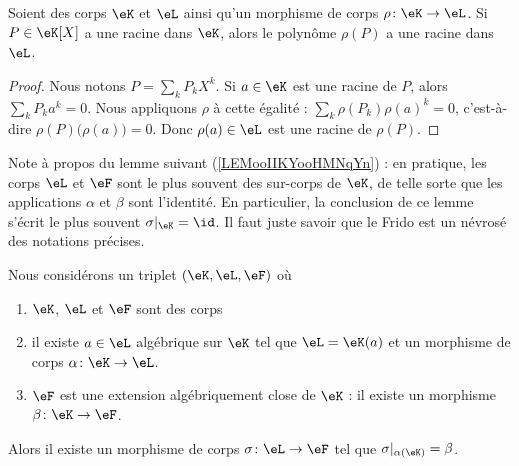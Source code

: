 \begin{lemma}
	Soient des corps \( \eK\) et \( \eL\) ainsi qu'un morphisme de corps \( \rho \colon \eK\to \eL\). Si \( P\in \eK[X]\) a une racine dans \( \eK\), alors le polynôme \( \rho(P)\) a une racine dans \( \eL\).
\end{lemma}

\begin{proof}
	Nous notons \( P=\sum_kP_kX^k\). Si \( a\in \eK\) est une racine de \( P\), alors \( \sum_kP_ka^k=0\). Nous appliquons \( \rho\) à cette égalité : \( \sum_k\rho(P_k)\rho(a)^k=0\), c'est-à-dire \( \rho(P)\big( \rho(a) \big)=0\). Donc \( \rho(a)\in \eL\) est une racine de \( \rho(P)\).
\end{proof}


Note à propos du lemme suivant (\ref{LEMooIIKYooHMNqYn}) : en pratique, les corps \( \eL\) et \( \eF\) sont le plus souvent des sur-corps de \( \eK\), de telle sorte que les applications \( \alpha\) et \( \beta\) sont l'identité. En particulier, la conclusion de ce lemme s'écrit le plus souvent \( \sigma|_{\eK}=\id\). Il faut juste savoir que le Frido est un névrosé des notations précises.

\begin{lemma}     \label{LEMooIIKYooHMNqYn}
	Nous considérons un triplet \( (\eK,\eL,\eF)\) où
	\begin{enumerate}
		\item
		      \( \eK\), \( \eL\) et \( \eF\) sont des corps
		\item
		      il existe \( a\in \eL\) algébrique sur \( \eK\) tel que \( \eL=\eK(a)\) et un morphisme de corps \( \alpha\colon \eK\to \eL\).
		\item
		      \( \eF\) est une extension algébriquement close de \( \eK\) : il existe un morphisme \( \beta\colon \eK\to \eF\).
	\end{enumerate}
	Alors il existe un morphisme de corps \( \sigma\colon \eL\to \eF\) tel que \( \sigma|_{\alpha(\eK)}=\beta\).
\end{lemma}


